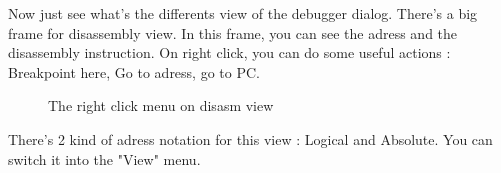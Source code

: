 \documentclass[10pt]{report}
\begin{document}
Now just see what's the differents view of the debugger dialog.\newline
There's a big frame for disassembly view.\newline
In this frame, you can see the adress and the disassembly instruction.\newline
On right click, you can do some useful actions : Breakpoint here, Go to adress, go to PC.\newline
\begin{figure}[H]
\centering
{}
\caption{The right click menu on disasm view}
\end{figure}

There's 2 kind of adress notation for this view : Logical and Absolute.\newline 
You can switch it into the "View" menu.\newline
\end{document}
